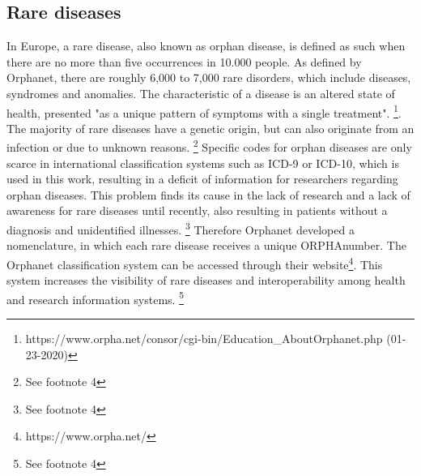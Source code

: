 \documentclass[11pt, a4paper, oneside]{book}
\begin{document}
\subsection{Rare diseases}
In Europe, a rare disease, also known as orphan disease, is defined as such when there are no more than five occurrences in 10.000 people. As defined by Orphanet, there are roughly 6,000 to 7,000 rare disorders, which include diseases, syndromes and anomalies. The characteristic of a disease is an altered state of health, presented "as a unique pattern of symptoms with a single treatment". \footnote{\label{Orphanet}https://www.orpha.net/consor/cgi-bin/Education\_AboutOrphanet.php (01-23-2020)}. The majority of rare diseases have a genetic origin, but can also originate from an infection or due to unknown reasons. \footnote{See footnote 4} Specific codes for orphan diseases are only scarce in international classification systems such as ICD-9 or ICD-10, which is used in this work, resulting in a deficit of information for researchers regarding orphan diseases. This problem finds its cause in the lack of research and a lack of awareness for rare diseases until recently, also resulting in patients without a diagnosis and unidentified illnesses. \footnote{See footnote 4}
Therefore Orphanet developed a nomenclature, in which each rare disease receives a unique ORPHAnumber. The Orphanet classification system can be accessed through their website\footnote{https://www.orpha.net/}. This system increases the visibility of rare diseases and interoperability among health and research information systems. \footnote{See footnote 4}
\end{document}
